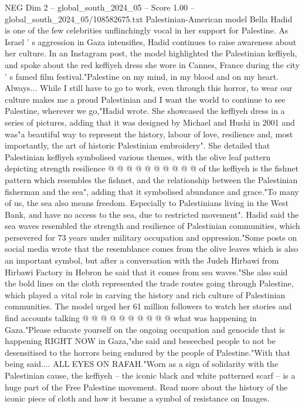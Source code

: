 \begin{textsample}{NEG Dim 2 – global\_south\_2024\_05 – Score 1.00 – global\_south\_2024\_05/108582675.txt}  \label{ex:f2_neg_371}
Palestinian-American model Bella Hadid is one of the few celebrities unflinchingly vocal in her support for Palestine.
As Israel ' s aggression in Gaza intensifies, Hadid continues to raise awareness about her culture.
In an Instagram post, the model highlighted the Palestinian keffiyeh, and spoke about the red keffiyeh dress she wore in Cannes, France during the city ' s famed film festival."Palestine on my mind, in my blood and on my heart.
Always...
While I still have to go to work, even through this horror, to wear our culture makes me a proud Palestinian and I want the world to continue to see Palestine, wherever we go,"Hadid wrote.
She showcased the keffiyeh dress in a series of pictures, adding that it was designed by Michael and Hushi in 2001 and was"a beautiful way to represent the history, labour of love, resilience and, most importantly, the art of historic Palestinian embroidery".
She detailed that Palestinian keffiyeh symbolised various themes, with the olive leaf pattern depicting strength resilience @ @ @ @ @ @ @ @ @ @ of the keffiyeh is the fishnet pattern which resembles the fishnet, and the relationship between the Palestinian fisherman and the sea", adding that it symbolised abundance and grace."To many of us, the sea also means freedom.
Especially to Palestinians living in the West Bank, and have no access to the sea, due to restricted movement".
Hadid said the sea waves resembled the strength and resilience of Palestinian communities, which persevered for 73 years under military occupation and oppression."Some posts on social media wrote that the resemblance comes from the olive leaves which is also an important symbol, but after a conversation with the Judeh Hirbawi from Hirbawi Factory in Hebron he said that it comes from sea waves."She also said the bold lines on the cloth represented the trade routes going through Palestine, which played a vital role in carving the history and rich culture of Palestinian communities.
The model urged her 61 million followers to watch her stories and find accounts talking @ @ @ @ @ @ @ @ @ @ what was happening in Gaza."Please educate yourself on the ongoing occupation and genocide that is happening RIGHT NOW in Gaza,"she said and beseeched people to not be desensitised to the horrors being endured by the people of Palestine."With that being said....
ALL EYES ON RAFAH."Worn as a sign of solidarity with the Palestinian cause, the keffiyeh -- the iconic black and white patterned scarf -- is a huge part of the Free Palestine movement.
Read more about the history of the iconic piece of cloth and how it became a symbol of resistance on Images.

\end{textsample}
